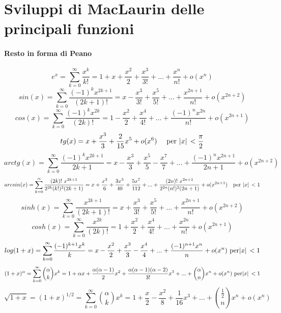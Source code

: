 \documentclass[a4paper, titlepage]{report}%
\theoremstyle{definition} %
\theoremstyle{plain}
\theoremstyle{plain}
\theoremstyle{remark}
\theoremstyle{remark}
\theoremstyle{plain}
\theoremstyle{plain}
\theoremstyle{plain}
\theoremstyle{plain}
\theoremstyle{plain}
\begin{document}

\section*{Sviluppi di MacLaurin delle principali funzioni}
\paragraph*{Resto in forma di Peano}
\[
  e^x = \sum_{k = 0}^{\infty}\frac{x^k}{k!} =
        1 + x + \frac{x^2}{2}+ \frac{x^3}{3!} +
        ... + \frac{x^n}{n!}+o(x^n)
\]
\[
   sin(x) = \sum_{k = 0}^{\infty} \frac{(-1)^kx^{2k+1}}{(2k+1)!} =
   x - \frac{x^3}{3!}+ \frac{x^5}{5!} +
   ... + \frac{x^{2n+1}}{n!}+o(x^{2n+2})
\]
\[
    cos(x)=\sum_{k = 0}^{\infty}\frac{(-1)^kx^{2k}}{(2k)!} =
    1 - \frac{x^2}{2}+ \frac{x^4}{4!} +
    ... + \frac{(-1)^{n}x^{2n}}{n!}+o(x^{2n+1})
\]
\[
   tg(x)= x + \frac{x^3}{3} + \frac{2}{15}x^5+o(x^6) 
   \text{   \quad per   }\abs*{x}< \frac{\pi}{2}
\]
\[
   arctg(x)= \sum_{k = 0}^{\infty} \frac{(-1)^kx^{2k+1}}{2k+1}
    = x - \frac{x^3}{3} + \frac{x^5}{5}-\frac{x^7}{7} + ... +
    \frac{(-1)^nx^{2n+1}}{2n+1} + o(x^{2n+2})
\]
\[
   arcsin(x)= \sum_{k = 0}^{\infty} \frac{(2k)! \ x^{2k+1}}{2^{2k}(k!)^2
    (2k+1)} = x + \frac{x^3}{6} + \frac{3x^5}{40}+\frac{5x^7}{112} + ... +
    \frac{(2n)! \ x^{2n+1}}{2^{2n}(n!)^2(2n+1)} + o(x^{2n+1})
     \ \ \text{  per} \ \abs*{x}<1 
\]
\[
    sinh(x)=\sum_{k = 0}^{\infty}\frac{x^{2k+1}}{(2k+1)!} =
    x + \frac{x^3}{3!} + \frac{x^5}{5!} +
    ... + \frac{x^{2n+1}}{n!}+o(x^{2n+2}) 
\]
\[
   cosh(x)=\sum_{k = 0}^{\infty}\frac{x^{2k}}{(2k)!} =
    1 + \frac{x^2}{2}+ \frac{x^4}{4!} +
    ... + \frac{x^{2n}}{n!}+o(x^{2n+1})
\]   
\[
   log(1+x) =  \sum_{k = 0}^{\infty}\frac{(-1)^{k+1}x^{k}}{k} =
   x - \frac{x^2}{2} + \frac{x^3}{3} - \frac{x^4}{4} +
   ... + \frac{(-1)^{n+1}x^{n}}{n}+o(x^n)  \text{  per}\abs*{x}<1 
\]
\[
   (1+x)^{\alpha} =  \sum_{k = 0}^{\infty}\binom{\alpha}{k}  x^k =
   1 + \alpha x + \frac{\alpha(\alpha -1)}{2}x^2 + \frac{\alpha(\alpha -1)
   (\alpha -2)}{3!}x^3 +... + \binom{\alpha}{n}x^n+o(x^n) 
    \text{  per}\abs*{x}<1 
\]
\[
   \sqrt{1+x}=(1+x)^{1/2} =  \sum_{k = 0}^{\infty}\binom{\alpha}{k}  x^k =
   1 + \frac{x}{2} - \frac{x^2}{8} + \frac{1}{16}x^3 +... + 
   \binom{\frac{1}{2}}{n}x^n+o(x^n) 
\]
%
%
\end{document}
